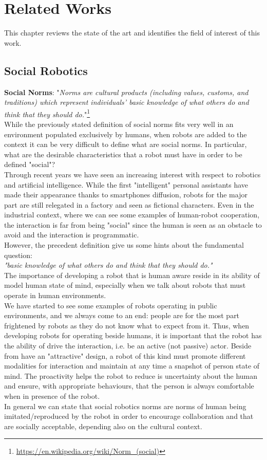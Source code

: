 \documentclass[pdftex,12pt,a4paper]{report}
\begin{document}
\chapter{Related Works}
This chapter reviews the state of the art and identifies the field of interest of this work.

\section{Social Robotics}
\textbf{Social Norms}: "\textit{Norms are cultural products (including values, customs, and traditions) which represent individuals' basic knowledge of what others do and think that they should do.}"\footnote{\url{https://en.wikipedia.org/wiki/Norm_(social)}}\\
\newline
\noindent While the previously stated definition of social norms fits very well in an environment populated exclusively by humans, when robots are added to the context it can be very difficult to define what are social norms. In particular, what are the desirable characteristics that a robot must have in order to be defined "social"?\\
\noindent Through recent years we have seen an increasing interest with respect to robotics and artificial intelligence. %
While the first "intelligent" personal assistants have made their appearance thanks to smartphones diffusion, robots for the major part are still relegated in a factory and seen as fictional characters.
Even in the industrial context, where we can see some examples of human-robot cooperation, the interaction is far from being "social" since the human is seen as an obstacle to avoid and the interaction is programmatic.\\
However, the precedent definition  give us some hints about the fundamental question:\\ 
\noindent\textit{"basic knowledge of what others do and think that they should do."}\\
The importance of developing a robot that is human aware reside in its ability of model human state of mind, especially when we talk about robots that must operate in human environments.\\
We have started to see some examples of robots operating in public environments, and we always come to an end: people are for the most part frightened by robots as they do not know what to expect from it.
Thus, when developing robots for operating beside humans, it is important that the robot has the ability of  drive the interaction, i.e. be an active (not passive) actor. Beside from have an "attractive" design, a robot of this kind must promote different modalities for interaction and maintain at any time a snapshot of person state of mind. The proactivity helps the robot to reduce is uncertainty about the human and ensure, with appropriate behaviours, that the person is always comfortable when in presence of the robot.\\
In general we can state that social robotics norms are norms of human being imitated/reproduced by the robot in order to encourage collaboration and that are socially acceptable, depending also on the cultural context.\\ 
\end{document}
